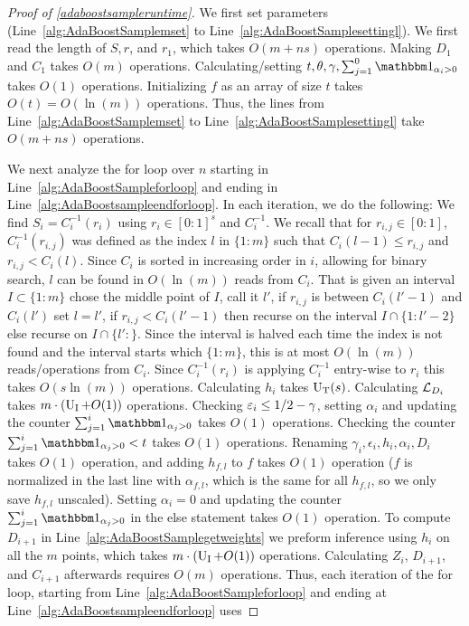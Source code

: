 \begin{proof}[Proof of \cref{adaboostsampleruntime}]

We first set parameters (Line~\ref{alg:AdaBoostSamplemset} to Line~\ref{alg:AdaBoostSamplesettingl}). We first read the length of $S, r$, and $r_{1}$, which takes $O(m+ns)$ operations. Making $D_{1}$ and $C_{1}$ takes $O(m)$ operations. Calculating/setting $t,\theta,\gamma,\sum_{j=1}^{0}\ind_{\alpha_{i}>0}$ takes $O(1)$ operations. Initializing $f$ as an array of size $t$ takes $O(t)=O(\ln{(m)})$ operations. Thus, the lines from Line~\ref{alg:AdaBoostSamplemset} to Line~\ref{alg:AdaBoostSamplesettingl} take $O(m+ns)$ operations.

We next analyze the for loop over $n$ starting in Line~\ref{alg:AdaBoostSampleforloop} and ending in Line~\ref{alg:AdaBoostsampleendforloop}. In each iteration, we do the following: We find $S_i=C_{i}^{-1}(r_{i})$ using $r_{i}\in[0:1]^{s}$ and $C_{i}^{-1}$. We recall that for $r_{i,j}\in[0:1]$, $C_{i}^{-1}(r_{i,j})$ was defined as the index $l$ in $\{ 1:m \}$ such that $C_{i}(l-1)\leq r_{i,j}$  and $r_{i,j}<C_{i}(l) $. Since $C_{i}$ is sorted in increasing order in $ i $, allowing for binary search, $ l $ can be found in $ O(\ln{(m )}) $ reads from $ C_{i} $. That is given an interval $ I\subset \{ 1:m \} $ chose the middle point of $ I $, call it $ l' $, if $r_{i,j}$ is between $ C_{i}(l'-1) $ and $ C_{i}(l') $ set $ l=l'$, if $r_{i,j} <C_{i}(l'-1)$ then recurse on the interval $ I\cap\{ 1:l'-2 \} $ else recurse on $ I\cap\{ l': \} $. Since the interval is halved each time the index is not found and the interval starts which $ \{ 1:m \} $, this is at most $O( \ln{(m )}) $ reads/operations from $ C_{i} $. Since $C_{i}^{-1}(r_{i})$ is applying $ C_{i}^{-1} $ entry-wise to $ r_{i} $  this takes $O(s\ln{\left(m \right)})$ operations. Calculating $h_{i}$ takes $\operatorname{U_{T}}(s)$. Calculating $\operatorname{\mathcal{L}}_{D_{i}}$ takes $m\cdot (\operatorname{U_{I}}+O(1))$ operations. Checking $\varepsilon_{i}\leq 1/2-\gamma$, setting $\alpha_{i}$ and updating the counter $\sum_{j=1}^{i}\ind_{\alpha_{j}>0}$ takes $O(1)$ operations. Checking the counter $\sum_{j=1}^{i}\ind_{\alpha_{j}>0}<t$ takes $O(1)$ operations. Renaming $\gamma_{i},\epsilon_{i},h_{i},\alpha_{i},D_{i}$ takes $O(1)$ operation, and adding $h_{f,l}$ to $f$ takes $O(1)$ operation ($ f $ is normalized in the last line with $ \alpha_{f,l} $, which is the same for all $ h_{f,l} $, so we only save $ h_{f,l} $ unscaled). Setting $\alpha_{i}=0$ and updating the counter $\sum_{j=1}^{i}\ind_{\alpha_{j}>0}$ in the else statement takes $O(1)$ operation. To compute $D_{i+1}$ in Line~\ref{alg:AdaBoostSamplegetweights} we preform inference using $h_{i}$ on all the $m$ points, which takes $m\cdot(\operatorname{U_{I}}+O(1))$ operations. Calculating $Z_{i}$, $D_{i+1}$, and $C_{i+1}$ afterwards requires $O(m)$ operations. Thus, each iteration of the for loop, starting from  Line~\ref{alg:AdaBoostSampleforloop} and ending at Line~\ref{alg:AdaBoostsampleendforloop} uses 

\end{proof}
